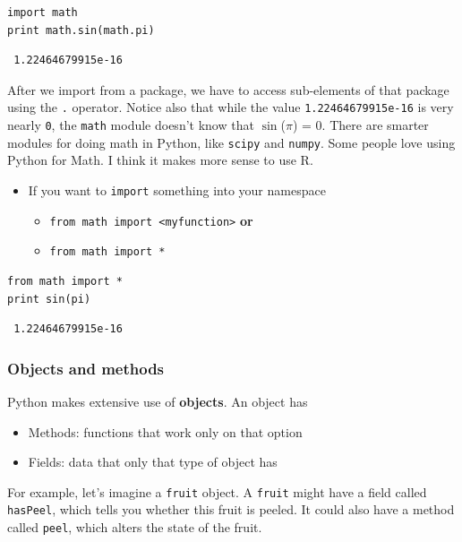 \documentclass[11pt]{article}
\begin{document}
\begin{verbatim}
import math
print math.sin(math.pi)
\end{verbatim}

\begin{verbatim}
 1.22464679915e-16
\end{verbatim}

After we import from a package, we have to access sub-elements of that
package using the \texttt{.} operator.  Notice also that while the value
\texttt{1.22464679915e-16} is very nearly \texttt{0}, the \texttt{math} module doesn't know
that $\sin$($\pi$) = 0.  There are smarter modules for doing math in
Python, like \texttt{scipy} and \texttt{numpy}.  Some people love using Python for
Math.  I think it makes more sense to use R.

\begin{itemize}
\item If you want to \texttt{import} something into your namespace
\begin{itemize}
\item \texttt{from math import <myfunction>} \textbf{or}
\item \texttt{from math import *}
\end{itemize}
\end{itemize}


\begin{verbatim}
from math import *
print sin(pi)
\end{verbatim}

\begin{verbatim}
 1.22464679915e-16
\end{verbatim}
\subsubsection{Objects and methods}
\label{sec-2-3-4}


Python makes extensive use of \textbf{objects}.  An object has
\begin{itemize}
\item Methods: functions that work only on that option
\item Fields: data that only that type of object has
\end{itemize}

For example, let's imagine a \texttt{fruit} object.  A \texttt{fruit} might have a
field called \texttt{hasPeel}, which tells you whether this fruit is
peeled. It could also have a method called \texttt{peel}, which alters the
state of the fruit.
\end{document}
